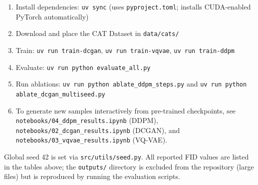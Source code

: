 \documentclass[12pt,a4paper]{article}
\begin{document}
\begin{enumerate}[noitemsep]
  \item Install dependencies: \texttt{uv sync} (uses \texttt{pyproject.toml}; installs CUDA-enabled PyTorch automatically)
  \item Download and place the CAT Dataset in \texttt{data/cats/}
  \item Train: \texttt{uv run train-dcgan}, \texttt{uv run train-vqvae}, \texttt{uv run train-ddpm}
  \item Evaluate: \texttt{uv run python evaluate\_all.py}
  \item Run ablations: \texttt{uv run python ablate\_ddpm\_steps.py} and \texttt{uv run python ablate\_dcgan\_multiseed.py}
  \item To generate new samples interactively from pre-trained checkpoints, see \texttt{notebooks/04\_ddpm\_results.ipynb} (DDPM), \texttt{notebooks/02\_dcgan\_results.ipynb} (DCGAN), and \texttt{notebooks/03\_vqvae\_results.ipynb} (VQ-VAE).
\end{enumerate}

Global seed 42 is set via \texttt{src/utils/seed.py}.
All reported FID values are listed in the tables above; the \texttt{outputs/}
directory is excluded from the repository (large files) but is reproduced by
running the evaluation scripts.



\end{document}

